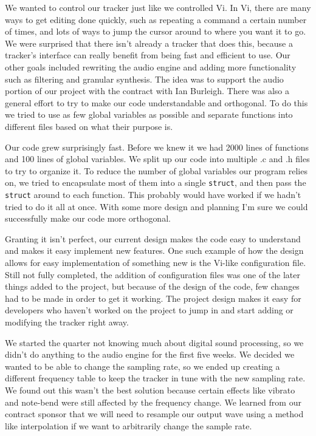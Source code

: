 \documentclass[12pt,letterpaper]{article}
\begin{document}
\par
We wanted to control our tracker just like we controlled Vi.
In Vi, there are many ways to get editing done quickly, such as repeating a command a certain number of times, and lots of ways to jump the cursor around to where you want it to go.
We were surprised that there isn't already a tracker that does this, because a tracker's interface can really benefit from being fast and efficient to use.
Our other goals included rewriting the audio engine and adding more functionality such as filtering and granular synthesis.
The idea was to support the audio portion of our project with the contract with Ian Burleigh.
There was also a general effort to try to make our code understandable and orthogonal.
To do this we tried to use as few global variables as possible and separate functions into different files based on what their purpose is.

\par
Our code grew surprisingly fast.
Before we knew it we had 2000 lines of functions and 100 lines of global variables.
We split up our code into multiple .c and .h files to try to organize it.
To reduce the number of global variables our program relies on, we tried to encapsulate most of them into a single {\tt struct}, and then pass the {\tt struct} around to each function.
This probably would have worked if we hadn't tried to do it all at once.
With some more design and planning I'm sure we could successfully make our code more orthogonal.

\par
Granting it isn't perfect, our current design makes the code easy to understand and makes it easy implement new features.
One such example of how the design allows for easy implementation of something new is the Vi-like configuration file. 
Still not fully completed, the addition of configuration files was one of the later things added to the project, but because of the design of the code, few changes had to be made in order to get it working.
The project design makes it easy for developers who haven't worked on the project to jump in and start adding or modifying the tracker right away.

\par
We started the quarter not knowing much about digital sound processing, so we didn't do anything to the audio engine for the first five weeks.
We decided we wanted to be able to change the sampling rate, so we ended up creating a different frequency table to keep the tracker in tune with the new sampling rate.
We found out this wasn't the best solution because certain effects like vibrato and note-bend were still affected by the frequency change.
We learned from our contract sponsor that we will need to resample our output wave using a method like interpolation if we want to arbitrarily change the sample rate.
\end{document}
